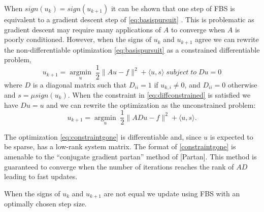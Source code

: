 \documentclass[11pt]{article}
\begin{document}
When $sign(u_k) = sign(u_{k+1})$ it can be shown that one step of FBS is equivalent to a gradient descent step of \cref{eq:basispursuit} \cite{Goldsteina}. This is problematic as gradient descent may require many applications of $A$ to converge when $A$ is poorly conditioned. However, when the signs of $u_k$ and $u_{k+1}$ agree we can rewrite the non-differentiable optimization \cref{eq:basispursuit} as a constrained differentiable problem,
\begin{equation} \label{eq:diffconstrained}
u_{k+1} =  \underset{u}{\operatorname{argmin}} \; \frac{1}{2} \|Au -f\|^2 + \langle u, s \rangle \;subject \; to \; Du=0
\end{equation}
where $D$ is a diagonal matrix such that $D_{ii} = 1$ if $u_{k,i} \neq 0$, and $D_{ii}=0$ otherwise and $s=\mu sign(u_k)$. When the constraint in \cref{eq:diffconstrained} is satisfied we have $Du=u$ and we can rewrite the optimization as the unconstrained problem:
\begin{equation}\label{eq:constraintgone}
u_{k+1} =  \underset{u}{\operatorname{argmin}} \; \frac{1}{2} \|ADu -f\|^2 + \langle u, s \rangle.
\end{equation}

The optimization \cref{eq:constraintgone} is differentiable and, since $u$ is expected to be sparse, has a low-rank system matrix. The format of \cref{constraintgone} is amenable to the ``conjugate gradient partan'' method of [Partan]. This method is guaranteed to converge when the number of iterations reaches the rank of $AD$ leading to fast updates.

When the signs of $u_k$ and $u_{k+1}$ are not equal we update using FBS with an optimally chosen step size.
\end{document}
